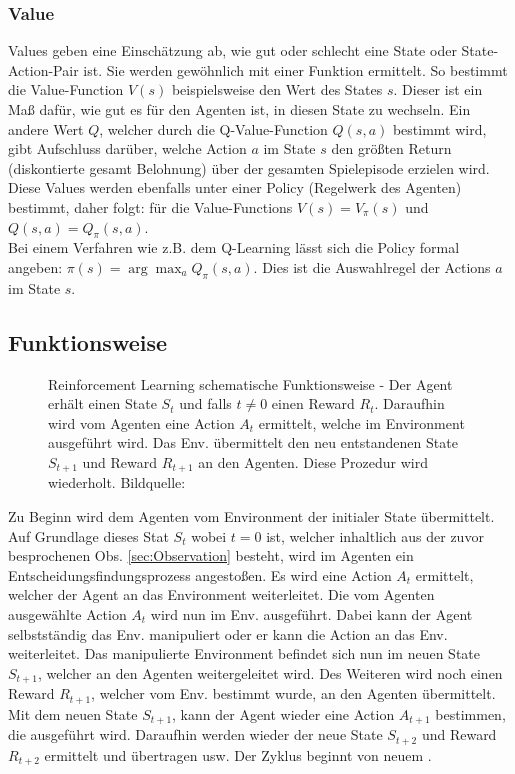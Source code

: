 \subsubsection{Value}
Values geben eine Einschätzung ab, wie gut oder schlecht eine State oder State-Action-Pair ist. Sie werden gewöhnlich mit einer Funktion ermittelt. So bestimmt die Value-Function $V(s)$ beispielsweise den Wert des States $s$. Dieser ist ein Maß dafür, wie gut es für den Agenten ist, in diesen State zu wechseln. Ein andere Wert $Q$, welcher durch die Q-Value-Function $Q(s,a)$ bestimmt wird, gibt Aufschluss darüber, welche Action $a$ im State $s$ den größten Return (diskontierte gesamt Belohnung) über der gesamten Spielepisode erzielen wird.
Diese Values werden ebenfalls unter einer Policy (Regelwerk des Agenten) bestimmt, daher folgt: für die Value-Functions $V(s) = V_\pi(s)$ und
$Q(s,a) = Q_\pi(s,a)$. \cite[S. 46]{Sutton1998} \\
Bei einem Verfahren wie z.B. dem Q-Learning lässt sich die Policy formal angeben: $\pi(s) = \arg\max_{a} Q_\pi(s,a)$. Dies ist die Auswahlregel der Actions $a$ im State $s$. \cite[S.291]{DRL_Lapan}

\subsection{Funktionsweise} \label{sec:Funktionsweise}
\begin{figure}[H]
	\centering
	\def\svgscale{1.0}
	
	\caption[Reinforcement Learning]{Reinforcement Learning schematische Funktionsweise - Der Agent erhält einen State $S_{t}$ und falls 
		$t \neq 0$ einen Reward $R_{t}$. Daraufhin wird vom Agenten eine Action $A_{t}$ ermittelt, welche im Environment ausgeführt wird. Das Env. übermittelt den neu entstandenen State $S_{t+1}$ und Reward $R_{t+1}$ an den Agenten. Diese Prozedur wird wiederholt. Bildquelle:
	\cite[S. 38]{Sutton1998}}
	\label{fig:Reinforcement Learning}
\end{figure}
Zu Beginn wird dem Agenten vom Environment der initialer State übermittelt. Auf Grundlage dieses Stat $S_{t}$ wobei $t=0$ ist, welcher inhaltlich aus der zuvor besprochenen Obs. \ref{sec:Observation} besteht, wird im Agenten ein Entscheidungsfindungsprozess angestoßen. Es wird eine Action $A_{t}$ ermittelt, welcher der Agent an das Environment weiterleitet. Die vom Agenten ausgewählte Action $A_{t}$ wird nun im Env. ausgeführt. Dabei kann der Agent selbstständig das Env. manipuliert oder er kann die Action an das Env. weiterleitet.
Das manipulierte Environment befindet sich nun im neuen State $S_{t+1}$, welcher an den Agenten weitergeleitet wird. Des Weiteren wird noch einen Reward $R_{t+1}$, welcher vom Env. bestimmt wurde, an den Agenten übermittelt.\\ 
Mit dem neuen State $S_{t+1}$, kann der Agent wieder eine Action $A_{t+1}$ bestimmen, die ausgeführt wird. Daraufhin werden wieder der neue State $S_{t+2}$ und Reward $R_{t+2}$ ermittelt und übertragen usw. Der Zyklus beginnt von neuem \cite[S. 37 ff.]{Sutton1998}.


